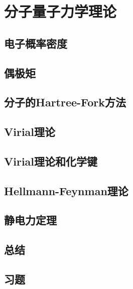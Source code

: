 \chapter{分子量子力学理论}
\section{电子概率密度}

\section{偶极矩}

\section{分子的Hartree-Fork方法}

\section{Virial理论}

\section{Virial理论和化学键}

\section{Hellmann-Feynman理论}

\section{静电力定理}

\section*{总结}

\section*{习题}